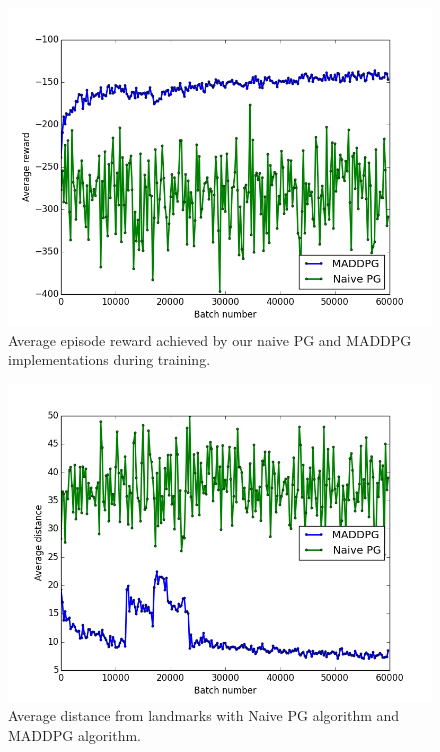 \documentclass{article}
\begin{document}
\begin{figure}
\begin{center}
\includegraphics[scale=0.35]{MADDPGvsPG}
\end{center}
\caption{Average episode reward achieved by our naive PG and MADDPG implementations during training.}
\label{fig:MADDPGvsPG}
\end{figure}

\begin{figure}
\begin{center}
\includegraphics[scale=0.35]{MADDPGvsPG_distance}
\end{center}
\caption{Average distance from landmarks with Naive PG algorithm and MADDPG algorithm.}
\label{fig:MADDPGvsPG_distance}
\end{figure}
\end{document}
